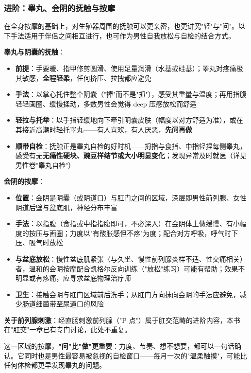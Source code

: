 \subsubsection{进阶：睾丸、会阴的抚触与按摩}

在全身按摩的基础上，对生殖器周围的抚触可以更亲密，也更讲究"轻"与"问"。以下手法适用于伴侣之间相互进行，也可作为男性自我放松与自检的结合方式。

\vspace{0.5em}
\noindent\textbf{睾丸与阴囊的抚触}：

\begin{itemize}
	\item \textbf{前提}：手要暖、指甲修剪圆滑、使用足量润滑（水基或硅基）；睪丸对疼痛极其敏感，\textbf{全程轻柔}，任何挤压、拉拽都应避免
	\item \textbf{手法}：以掌心托住整个阴囊（"捧"而不是"抓"），感受其重量与温度；再用指腹轻轻画圈、缓慢揉动，多数男性会觉得 deep 压感放松而舒适
	\item \textbf{轻拉与托举}：以手指轻缓地向下牵引阴囊皮肤（幅度以对方舒适为准），或在其接近高潮时轻托睾丸——有人喜欢，有人厌恶，\textbf{先问再做}
	\item \textbf{顺带自检}：抚触正是睾丸自检的好时机——拇指与食指、中指轻捏每侧睾丸，感受有无\textbf{无痛性硬块、豌豆样结节或大小明显变化}；发现异常及时就医（详见男性卷"睾丸自检"）
\end{itemize}

\vspace{0.5em}
\noindent\textbf{会阴的按摩}：

\begin{itemize}
	\item \textbf{位置}：会阴是阴囊（或阴道口）与肛门之间的区域，深层即男性前列腺、女性阴道后壁与盆底肌，神经分布丰富
	\item \textbf{手法}：以指腹（食指或中指指腹即可，不必深入）在会阴体上做缓慢、有小幅度的按压与画圈；力度以"有酸胀感但不疼"为度；配合对方呼吸，呼气时下压、吸气时放松
	\item \textbf{与盆底放松}：慢性盆底肌紧张（与久坐、慢性前列腺炎样不适、性交痛相关）者，温和的会阴按摩配合凯格尔反向训练（"放松"练习）可能有帮助；效果不明显或有疼痛，应寻求盆底物理治疗师
	\item \textbf{卫生}：接触会阴与肛门区域前后洗手；从肛门方向抹向会阴的手法应避免，减少肠道细菌带至尿道口的风险
\end{itemize}

\vspace{0.5em}
\noindent\textbf{关于前列腺刺激}：经直肠刺激前列腺（"P 点"）属于肛交范畴的进阶内容，本书在"肛交"一章已有专门讨论，此处不重复。

\begin{tcolorbox}[colback=pink!5!white,colframe=red!50!black,title=贴心小叮咛]
这一区域的按摩，\textbf{"问"比"做"更重要}：力度、节奏、想不想要，都可以一句话确认。它同时也是男性最容易被忽视的自检窗口——每月一次的"温柔触摸"，可能比任何体检都更早发现睾丸的问题。
\end{tcolorbox}

